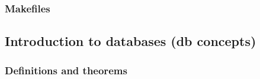 \documentclass{report}
\begin{document}
\begin{itemize}
\begin{itemize}
            \end{itemize}
   \end{itemize}
    
    \pagebreak 
    \subsubsection{Makefiles}

    \pagebreak 
    \bigbreak \noindent 
    \subsection{Introduction to databases (db concepts)}
    \bigbreak \noindent 
    \subsubsection{Definitions and theorems}
\end{document}
